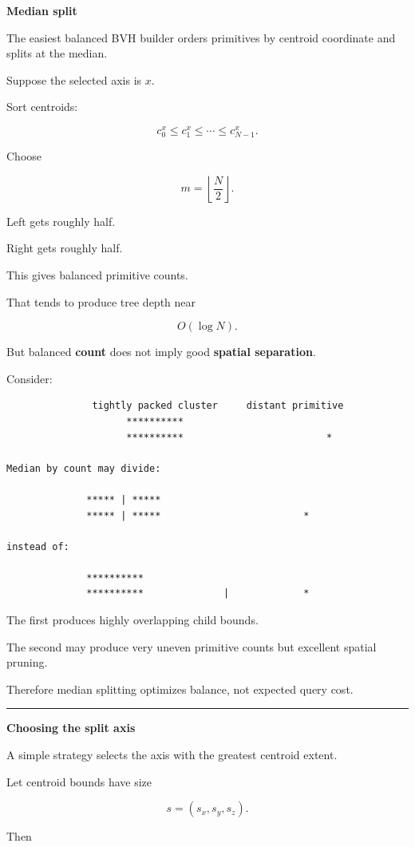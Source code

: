 \textbf{Median split}

The easiest balanced BVH builder orders primitives by centroid coordinate and splits at the median.

Suppose the selected axis is \(x\).

Sort centroids:

\[
c_0^x\le c_1^x\le\cdots\le c_{N-1}^x.
\]

Choose

\[
m=\left\lfloor\frac N2\right\rfloor.
\]

Left gets roughly half.

Right gets roughly half.

This gives balanced primitive counts.

That tends to produce tree depth near

\[
O(\log N).
\]

But balanced \textbf{count} does not imply good \textbf{spatial separation}.

Consider:

\begin{verbatim}
               tightly packed cluster     distant primitive
                     **********
                     **********                         *

Median by count may divide:

              ***** | *****
              ***** | *****                         *

instead of:

              **********
              **********              |             *
\end{verbatim}

The first produces highly overlapping child bounds.

The second may produce very uneven primitive counts but excellent spatial pruning.

Therefore median splitting optimizes balance, not expected query cost.

\begin{center}\rule{0.5\linewidth}{0.5pt}\end{center}

\textbf{Choosing the split axis}

A simple strategy selects the axis with the greatest centroid extent.

Let centroid bounds have size

\[
s=(s_x,s_y,s_z).
\]

Then

